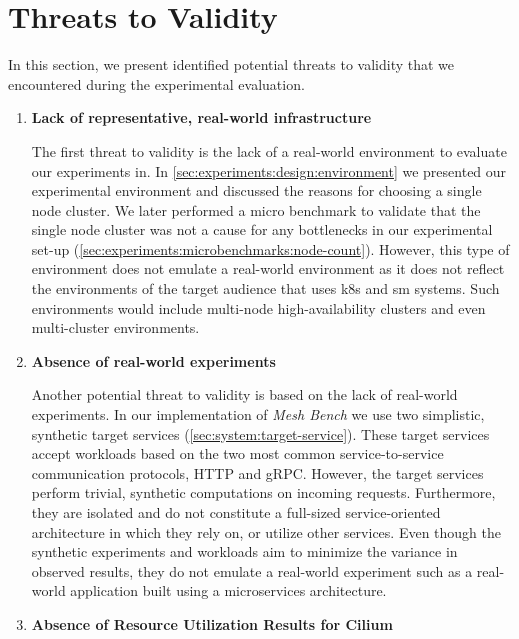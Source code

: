 \section{Threats to Validity}
\label{sec:experiments:threats}

In this section, we present identified potential threats to validity that we encountered during the experimental evaluation.

\begin{enumerate}
    \item \textbf{Lack of representative, real-world infrastructure}
    
    The first threat to validity is the lack of a real-world environment to evaluate our experiments in. In \cref{sec:experiments:design:environment} we presented our experimental environment and discussed the reasons for choosing a single node cluster. We later performed a micro benchmark to validate that the single node cluster was not a cause for any bottlenecks in our experimental set-up (\cref{sec:experiments:microbenchmarks:node-count}). However, this type of environment does not emulate a real-world environment as it does not reflect the environments of the target audience that uses \gls{k8s} and \gls{sm} systems. Such environments would include multi-node high-availability clusters and even multi-cluster environments.
    

    \item \textbf{Absence of real-world experiments}
    
    Another potential threat to validity is based on the lack of real-world experiments. In our implementation of \textit{Mesh Bench} we use two simplistic, synthetic target services (\cref{sec:system:target-service}). These target services accept workloads based on the two most common service-to-service communication protocols, HTTP and gRPC. However, the target services perform trivial, synthetic computations on incoming requests. Furthermore, they are isolated and do not constitute a full-sized service-oriented architecture in which they rely on, or utilize other services. Even though the synthetic experiments and workloads aim to minimize the variance in observed results, they do not emulate a real-world experiment such as a real-world application built using a microservices architecture.
    
    \item \textbf{Absence of Resource Utilization Results for Cilium}
    

\end{enumerate}
